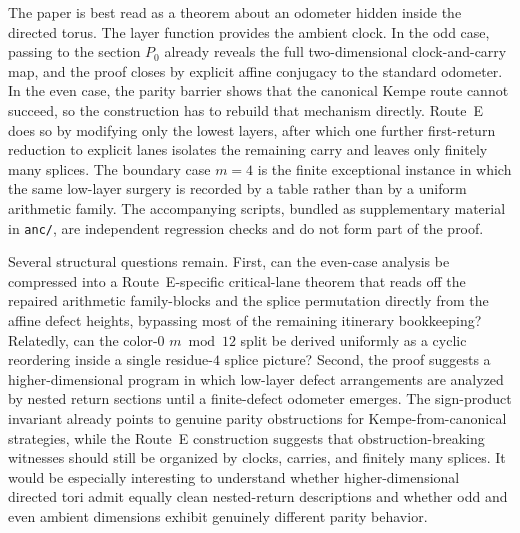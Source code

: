 \documentclass[11pt]{article}
\begin{document}
The paper is best read as a theorem about an odometer hidden inside the directed torus.
The layer function provides the ambient clock.
In the odd case, passing to the section $P_0$ already reveals the full two-dimensional clock-and-carry map, and the proof closes by explicit affine conjugacy to the standard odometer.
In the even case, the parity barrier shows that the canonical Kempe route cannot succeed, so the construction has to rebuild that mechanism directly.
Route~E does so by modifying only the lowest layers, after which one further first-return reduction to explicit lanes isolates the remaining carry and leaves only finitely many splices.
The boundary case $m=4$ is the finite exceptional instance in which the same low-layer surgery is recorded by a table rather than by a uniform arithmetic family.
The accompanying scripts, bundled as supplementary material in \texttt{anc/}, are independent regression checks and do not form part of the proof.

Several structural questions remain.
First, can the even-case analysis be compressed into a Route~E-specific critical-lane theorem that reads off the repaired arithmetic family-blocks and the splice permutation directly from the affine defect heights, bypassing most of the remaining itinerary bookkeeping?
Relatedly, can the color-$0$ $m\bmod 12$ split be derived uniformly as a cyclic reordering inside a single residue-$4$ splice picture?
Second, the proof suggests a higher-dimensional program in which low-layer defect arrangements are analyzed by nested return sections until a finite-defect odometer emerges.
The sign-product invariant already points to genuine parity obstructions for Kempe-from-canonical strategies, while the Route~E construction suggests that obstruction-breaking witnesses should still be organized by clocks, carries, and finitely many splices.
It would be especially interesting to understand whether higher-dimensional directed tori admit equally clean nested-return descriptions and whether odd and even ambient dimensions exhibit genuinely different parity behavior.

\appendix
\end{document}
